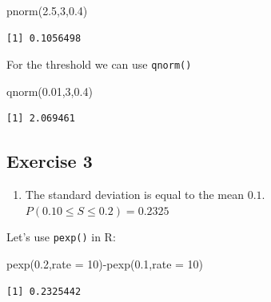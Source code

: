 \documentclass[
  letterpaper,
  DIV=11,
  numbers=noendperiod]{scrreprt}
\newenvironment{Shaded}{\begin{snugshade}}{\end{snugshade}}
\newcommand{\AttributeTok}[1]{\textcolor[rgb]{0.40,0.45,0.13}{#1}}
\newcommand{\DecValTok}[1]{\textcolor[rgb]{0.68,0.00,0.00}{#1}}
\newcommand{\FloatTok}[1]{\textcolor[rgb]{0.68,0.00,0.00}{#1}}
\newcommand{\FunctionTok}[1]{\textcolor[rgb]{0.28,0.35,0.67}{#1}}
\newcommand{\NormalTok}[1]{\textcolor[rgb]{0.00,0.23,0.31}{#1}}
\newcommand{\SpecialCharTok}[1]{\textcolor[rgb]{0.37,0.37,0.37}{#1}}
\providecommand{\tightlist}{%
  \setlength{\itemsep}{0pt}\setlength{\parskip}{0pt}}\usepackage{longtable,booktabs,array}
\begin{document}
\begin{Shaded}
\begin{Highlighting}[numbers=left,,]
\FunctionTok{pnorm}\NormalTok{(}\FloatTok{2.5}\NormalTok{,}\DecValTok{3}\NormalTok{,}\FloatTok{0.4}\NormalTok{)}
\end{Highlighting}
\end{Shaded}

\begin{verbatim}
[1] 0.1056498
\end{verbatim}

For the threshold we can use \texttt{qnorm()}

\begin{Shaded}
\begin{Highlighting}[numbers=left,,]
\FunctionTok{qnorm}\NormalTok{(}\FloatTok{0.01}\NormalTok{,}\DecValTok{3}\NormalTok{,}\FloatTok{0.4}\NormalTok{)}
\end{Highlighting}
\end{Shaded}

\begin{verbatim}
[1] 2.069461
\end{verbatim}

\hypertarget{exercise-3-19}{%
\subsection*{Exercise 3}\label{exercise-3-19}}

\begin{enumerate}
\def\labelenumi{\arabic{enumi}.}
\tightlist
\item
  The standard deviation is equal to the mean \(0.1\).
  \(P(0.10 \leq S \leq 0.2)=0.2325\)
\end{enumerate}

Let's use \texttt{pexp()} in R:

\begin{Shaded}
\begin{Highlighting}[numbers=left,,]
\FunctionTok{pexp}\NormalTok{(}\FloatTok{0.2}\NormalTok{,}\AttributeTok{rate =} \DecValTok{10}\NormalTok{)}\SpecialCharTok{{-}}\FunctionTok{pexp}\NormalTok{(}\FloatTok{0.1}\NormalTok{,}\AttributeTok{rate =} \DecValTok{10}\NormalTok{)}
\end{Highlighting}
\end{Shaded}

\begin{verbatim}
[1] 0.2325442
\end{verbatim}
\end{document}
